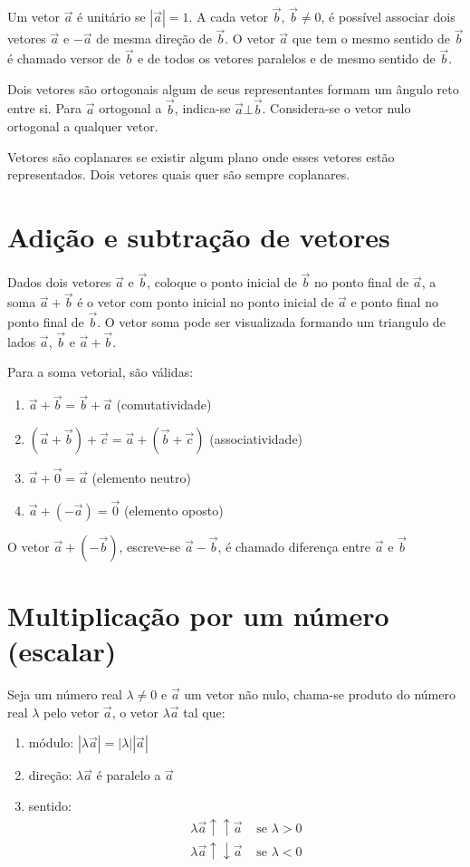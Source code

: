 \documentclass[12pt, oneside, a4paper, english, brazil]{abntex2}
\providecommand{\abs}[1]{\left\vert #1 \right\vert}
\renewcommand{\vec}{\overrightarrow}
\theoremstyle{normal}
\theoremstyle{observacao}
\begin{document}
Um vetor $\vec{a}$ é unitário se $\abs{\vec{a}}=1$. A cada vetor $\vec{b}$, $\vec{b} \neq 0$, é possível associar dois vetores $\vec{a}$ e $-\vec{a}$ de mesma direção de $\vec{b}$. O vetor $\vec{a}$ que tem o mesmo sentido de $\vec{b}$ é chamado versor de $\vec{b}$ e de todos os vetores paralelos e de mesmo sentido de $\vec{b}$. 

Dois vetores são ortogonais algum de seus representantes formam um ângulo reto entre si. Para $\vec{a}$ ortogonal a $\vec{b}$, indica-se $\vec{a} \bot \vec{b}$. Considera-se o vetor nulo ortogonal a qualquer vetor.

Vetores são coplanares se existir algum plano onde esses vetores estão representados. Dois vetores quais quer são sempre coplanares.

\section{Adição e subtração de vetores}

Dados dois vetores $\vec{a}$ e $\vec{b}$, coloque o ponto inicial de $\vec{b}$ no ponto final de $\vec{a}$, a soma $\vec{a} + \vec{b}$ é o vetor com ponto inicial no ponto inicial de $\vec{a}$ e ponto final no ponto final de $\vec{b}$. O vetor soma pode ser visualizada formando um triangulo de lados  $\vec{a}$, $\vec{b}$ e $\vec{a} + \vec{b}$.

Para a soma vetorial, são válidas:
\begin{enumerate}
\item $\vec{a} + \vec{b} = \vec{b}+\vec{a}$ (comutatividade)
\item $(\vec{a} + \vec{b})+\vec{c}=\vec{a} + (\vec{b}+\vec{c})$ (associatividade)
\item $\vec{a} + \vec{0} = \vec{a}$ (elemento neutro)
\item $\vec{a} + (-\vec{a}) = \vec{0}$ (elemento oposto)
\end{enumerate}

O vetor $\vec{a} + (-\vec{b})$, escreve-se $\vec{a}-\vec{b}$, é chamado diferença entre $\vec{a}$ e $\vec{b}$ 

\section{Multiplicação por um número (escalar)}

Seja um número real $\lambda \neq 0$ e $\vec{a}$ um vetor não nulo, chama-se produto do número real $\lambda$ pelo vetor $\vec{a}$, o vetor $\lambda \vec{a}$ tal que:
\begin{enumerate}
\item módulo: $\abs{\lambda\vec{a}} = \abs{\lambda}\abs{\vec{a}}$
\item direção: $\lambda\vec{a}$ é paralelo a $\vec{a}$
\item sentido: 
\begin{align*}
\lambda\vec{a} \uparrow \uparrow \vec{a} &\text{ se } \lambda > 0 \\
\lambda\vec{a} \uparrow \downarrow \vec{a} &\text{ se } \lambda < 0 
\end{align*}
\end{enumerate}
\end{document}
